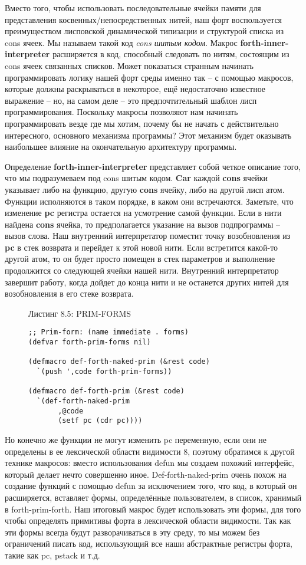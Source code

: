 Вместо того, чтобы использовать последовательные ячейки памяти для представления косвенных/непосредственных нитей, наш форт воспользуется преимуществом лисповской динамической типизации и структурой списка из cons ячеек. Мы называем такой код \emph{cons шитым кодом}. Макрос \textbf{forth-inner-interpreter} расширяется в код, способный следовать по нитям, состоящим из cons ячеек связанных списков. Может показаться странным начинать программировать логику нашей форт среды именно так -- с помощью макросов, которые должны раскрываться в некоторое, ещё недостаточно известное выражение -- но, на самом деле -- это предпочтительный шаблон лисп программирования. Поскольку макросы позволяют нам начинать программировать везде где мы хотим, почему бы не начать с действительно интересного, основного механизма программы? Этот механизм будет оказывать наибольшее влияние на окончательную архитектуру программы.

Определение \textbf{forth-inner-interpreter} представляет собой четкое описание того, что мы подразумеваем под cons шитым кодом. \textbf{Car} каждой \textbf{cons} ячейки указывает либо на функцию, другую \textbf{cons} ячейку, либо на другой лисп атом. Функции исполняются в таком порядке, в каком они встречаются. Заметьте, что изменение \textbf{pc} регистра остается на усмотрение самой функции. Если в нити найдена \textbf{cons} ячейка, то предполагается указание на вызов подпрограммы -- вызов слова. Наш внутренний интерпретатор поместит точку возобновления из \textbf{pc} в стек возврата и перейдет к этой новой нити. Если встретится какой-то другой атом, то он будет просто помещен в стек параметров и выполнение продолжится со следующей ячейки нашей нити. Внутренний интерпретатор завершит работу, когда дойдет до конца нити и не останется других нитей для возобновления в его стеке возврата.

\begin{figure}Листинг 8.5: PRIM-FORMS\label{listing_8.5}
  \listbegin
\begin{verbatim}
;; Prim-form: (name immediate . forms)
(defvar forth-prim-forms nil)

(defmacro def-forth-naked-prim (&rest code)
  `(push ',code forth-prim-forms))

(defmacro def-forth-prim (&rest code)
  `(def-forth-naked-prim
       ,@code
       (setf pc (cdr pc))))
\end{verbatim}
  \listend
\end{figure}

Но конечно же функции не могут изменить pc переменную, если они не определены в ее лексической области видимости 8, поэтому обратимся к другой технике макросов: вместо использования defun мы создаем похожий интерфейс, который делает нечто совершенно иное. Def-forth-naked-prim очень похож на создание функций с помощью defun за исключением того, что код, в который он расширяется, вставляет формы, определённые пользователем, в список, хранимый в forth-prim-forth. Наш итоговый макрос будет использовать эти формы, для того чтобы определять примитивы форта в лексической области видимости. Так как эти формы всегда будут разворачиваться в эту среду, то мы можем без ограничений писать код, использующий все наши абстрактные регистры форта, такие как pc, pstack и т.д.


